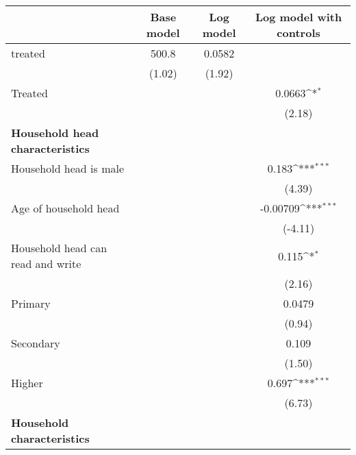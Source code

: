 {
\def\sym#1{\ifmmode^{#1}\else\(^{#1}\)\fi}
\begin{tabular}{l*{3}{c}}
\hline\hline
                    &\multicolumn{1}{c}{Base model}&\multicolumn{1}{c}{Log model}&\multicolumn{1}{c}{Log model with controls}\\
\hline
treated             &       500.8         &      0.0582         &                     \\
                    &      (1.02)         &      (1.92)         &                     \\
[1em]
Treated             &                     &                     &      0.0663\sym{*}  \\
                    &                     &                     &      (2.18)         \\
[1em]
\textbf{Household head characteristics}&                     &                     &                     \\
[1em]
Household head is male&                     &                     &       0.183\sym{***}\\
                    &                     &                     &      (4.39)         \\
[1em]
Age of household head&                     &                     &    -0.00709\sym{***}\\
                    &                     &                     &     (-4.11)         \\
[1em]
Household head can read and write&                     &                     &       0.115\sym{*}  \\
                    &                     &                     &      (2.16)         \\
[1em]
Primary             &                     &                     &      0.0479         \\
                    &                     &                     &      (0.94)         \\
[1em]
Secondary           &                     &                     &       0.109         \\
                    &                     &                     &      (1.50)         \\
[1em]
Higher              &                     &                     &       0.697\sym{***}\\
                    &                     &                     &      (6.73)         \\
[1em]
\textbf{Household characteristics}&                     &                     &                     \\

\end{tabular}}
